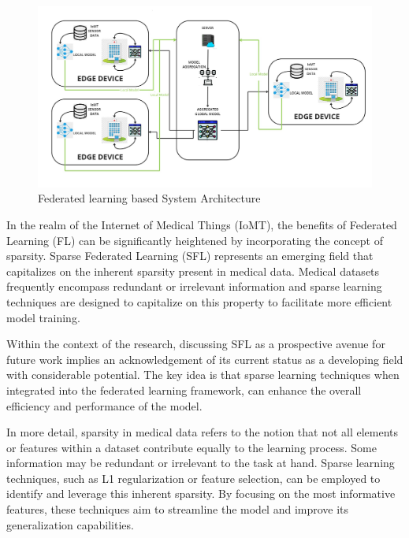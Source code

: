 \documentclass[conference]{IEEEtran}
\begin{document}
\begin{figure}[htp]
    \centering
    \includegraphics[scale = 0.14]{FL_ARCHITECTURE (3).jpg}
    \caption{Federated learning based System Architecture}
    \label{dis}
\end{figure}

In the realm of the Internet of Medical Things (IoMT), the benefits of Federated Learning (FL) can be significantly heightened by incorporating the concept of sparsity. Sparse Federated Learning (SFL) represents an emerging field that capitalizes on the inherent sparsity present in medical data. Medical datasets frequently encompass redundant or irrelevant information and sparse learning techniques are designed to capitalize on this property to facilitate more efficient model training.

Within the context of the research, discussing SFL as a prospective avenue for future work implies an acknowledgement of its current status as a developing field with considerable potential. The key idea is that sparse learning techniques when integrated into the federated learning framework, can enhance the overall efficiency and performance of the model.

In more detail, sparsity in medical data refers to the notion that not all elements or features within a dataset contribute equally to the learning process. Some information may be redundant or irrelevant to the task at hand. Sparse learning techniques, such as L1 regularization or feature selection, can be employed to identify and leverage this inherent sparsity. By focusing on the most informative features, these techniques aim to streamline the model and improve its generalization capabilities.

\end{document}
